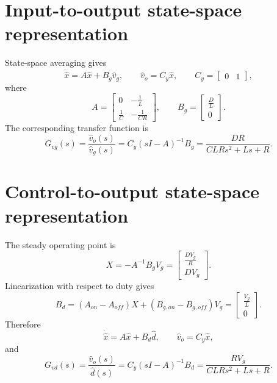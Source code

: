 \documentclass[11pt]{article}
\begin{document}
\section*{Input-to-output state-space representation}
State-space averaging gives
\begin{equation}
\dot{\hat x}=A\hat x+B_g\hat v_g,\qquad
\hat v_o=C_y\hat x,\qquad C_y=\begin{bmatrix}0&1\end{bmatrix},
\end{equation}
where
\begin{equation}
A=\left[\begin{matrix}0 & - \frac{1}{L}\\\frac{1}{C} & - \frac{1}{C R}\end{matrix}\right],\qquad B_g=\left[\begin{matrix}\frac{D}{L}\\0\end{matrix}\right].
\end{equation}
The corresponding transfer function is
\begin{equation}
G_{vg}(s)=\frac{\hat v_o(s)}{\hat v_g(s)}
=C_y(sI-A)^{-1}B_g=\frac{D R}{C L R s^{2} + L s + R}.
\end{equation}

\section*{Control-to-output state-space representation}
The steady operating point is
\begin{equation}
X=-A^{-1}B_gV_g=\left[\begin{matrix}\frac{D V_{g}}{R}\\D V_{g}\end{matrix}\right].
\end{equation}
Linearization with respect to duty gives
\begin{equation}
B_d=(A_{on}-A_{off})X+(B_{g,on}-B_{g,off})V_g
=\left[\begin{matrix}\frac{V_{g}}{L}\\0\end{matrix}\right].
\end{equation}
Therefore
\begin{equation}
\dot{\hat x}=A\hat x+B_d\hat d,\qquad
\hat v_o=C_y\hat x,
\end{equation}
and
\begin{equation}
G_{vd}(s)=\frac{\hat v_o(s)}{\hat d(s)}
=C_y(sI-A)^{-1}B_d=\frac{R V_{g}}{C L R s^{2} + L s + R}.
\end{equation}
\end{document}
